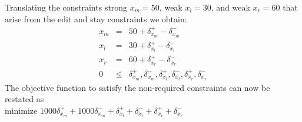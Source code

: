\documentclass{uist96}
\newcommand{\strength}{\rm}
\begin{document}
Translating the constraints
{\strength strong} $x_m = 50$, 
{\strength weak} $x_l = 30$,
and {\strength weak} $x_r = 60$
that arise from the 
edit and stay constraints we obtain:
$$\begin{array}{rcl}
x_m & = &50 + \delta_{x_m}^+ -  \delta_{x_m}^- \\
x_l & = &30 + \delta_{x_l}^+ -  \delta_{x_l}^- \\
x_r &= &60 + \delta_{x_r}^+ -  \delta_{x_r}^- \\
0 &\leq& \delta_{x_m}^+, \delta_{x_m}^-, \delta_{x_l}^+, \delta_{x_l}^-, 
	\delta_{x_r}^+, \delta_{x_r}^-
\end{array}$$
The objective function to satisfy the
non-required constraints 
can now be restated as \\
\hspace*{5mm}
minimize $1000 \delta_{x_m}^+ + 1000  \delta_{x_m}^- + \delta_{x_l}^+ +  
	\delta_{x_l}^- + \delta_{x_r}^+ +  \delta_{x_r}^-$
\end{document}
